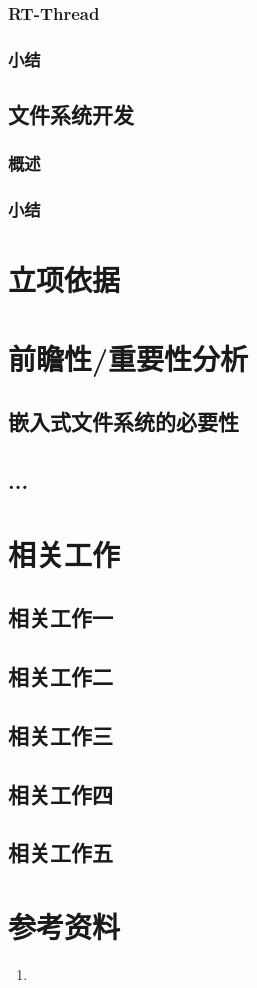 \documentclass[a4paper]{article}
\begin{document}
\subsubsection{RT-Thread}
\subsubsection{小结}

\subsection{文件系统开发}
\subsubsection{概述}
\subsubsection{小结}

\section{立项依据}



\section{前瞻性/重要性分析}
\subsection{嵌入式文件系统的必要性}
\subsection{...}
\section{相关工作}
\subsection{相关工作一}
\subsection{相关工作二}
\subsection{相关工作三}
\subsection{相关工作四}
\subsection{相关工作五}

\section{参考资料}
\begin{enumerate}
    \item 
    
\end{enumerate}
\end{document}
